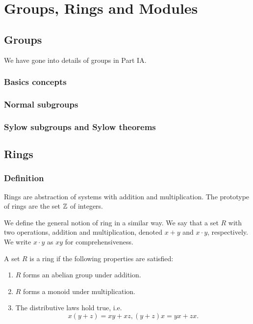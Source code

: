 \documentclass[main.tex]{subfiles}
\begin{document}
	\chapter{Groups, Rings and Modules}
		\section{Groups}
		We have gone into details of groups in Part IA.
			\subsection{Basics concepts}
			
			\subsection{Normal subgroups}
			
			\subsection{Sylow subgroups and Sylow theorems}
		\section{Rings}
			\subsection{Definition}
			Rings are abstraction of systems with addition and multiplication. The prototype of rings are the set $\mathbb Z$ of integers.
			
			We define the general notion of ring in a similar way. We say that a set $R$ with two operations, addition and multiplication, denoted $x + y$ and $x \cdot y$, respectively.
			We write $x \cdot y$ as $xy$ for comprehensiveness.
			\begin{definition}
				A set $R$ is a ring if the following properties are satisfied:
				\begin{enumerate}
					\item $R$ forms an abelian group under addition.
					\item $R$ forms a monoid under multiplication.
					\item The distributive laws hold true, i.e.
					\begin{equation*}
						x(y + z) = xy + xz, (y + z)x = yx + zx.
					\end{equation*}
				\end{enumerate}
			\end{definition}
\end{document}
